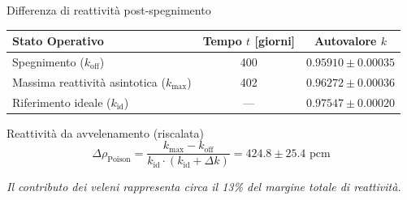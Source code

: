 \documentclass[aspectratio=169]{beamer} %
\begin{document}
\begin{frame}{Differenza di reattività post-spegnimento}

        \centering
        \vspace{0.5em}
        \begin{tabular}{lcc}
            \toprule
            \textbf{Stato Operativo} & \textbf{Tempo $t$ [giorni]} & \textbf{Autovalore $k$} \\
            \midrule
            Spegnimento ($k_{\text{off}}$) & 400 & $0.95910 \pm 0.00035$ \\
            Massima reattività asintotica ($k_{\text{max}}$) & 402 & $0.96272 \pm 0.00036$ \\
            Riferimento ideale ($k_{\text{id}}$) & — & $0.97547 \pm 0.00020$ \\
            \bottomrule
        \end{tabular}
        \vspace{0.3em}

    \vspace{1em}

    \begin{alertblock}{Reattività da avvelenamento (riscalata)}
        \begin{equation*}
            \Delta\rho_{\text{Poison}} = \frac{k_{\text{max}} - k_{\text{off}}}{k_{\text{id}} \cdot (k_{\text{id}} + \Delta k)} = \boxed{424.8 \pm 25.4 \text{ pcm}}
        \end{equation*}
    \end{alertblock}

    \vfill
    \centering
    \footnotesize \textit{Il contributo dei veleni rappresenta circa il 13\% del margine totale di reattività.}

\end{frame}
\end{document}
